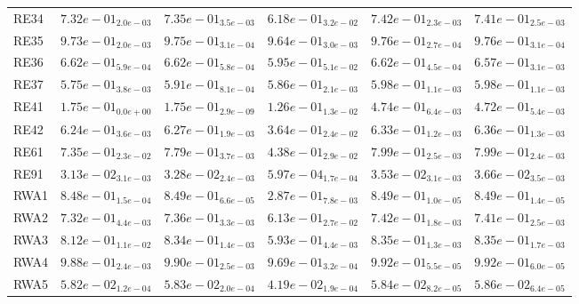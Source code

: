 \documentclass{article}
\begin{document}
\begin{table}
\begin{scriptsize}
\begin{tabular}{llllll}
RE34 & $  7.32e-01_{ 2.0e-03}$ & $  7.35e-01_{ 3.5e-03}$ & $  6.18e-01_{ 3.2e-02}$ & \cellcolor{gray95}$  7.42e-01_{ 2.3e-03}$ & \cellcolor{gray25}$  7.41e-01_{ 2.5e-03}$ \\
RE35 & $  9.73e-01_{ 2.0e-03}$ & $  9.75e-01_{ 3.1e-04}$ & $  9.64e-01_{ 3.0e-03}$ & \cellcolor{gray95}$  9.76e-01_{ 2.7e-04}$ & \cellcolor{gray25}$  9.76e-01_{ 3.1e-04}$ \\
RE36 & $  6.62e-01_{ 5.9e-04}$ & \cellcolor{gray25}$  6.62e-01_{ 5.8e-04}$ & $  5.95e-01_{ 5.1e-02}$ & \cellcolor{gray95}$  6.62e-01_{ 4.5e-04}$ & $  6.57e-01_{ 3.1e-03}$ \\
RE37 & $  5.75e-01_{ 3.8e-03}$ & $  5.91e-01_{ 8.1e-04}$ & $  5.86e-01_{ 2.1e-03}$ & \cellcolor{gray95}$  5.98e-01_{ 1.1e-03}$ & \cellcolor{gray25}$  5.98e-01_{ 1.1e-03}$ \\
RE41 & $  1.75e-01_{ 0.0e+00}$ & $  1.75e-01_{ 2.9e-09}$ & $  1.26e-01_{ 1.3e-02}$ & \cellcolor{gray95}$  4.74e-01_{ 6.4e-03}$ & \cellcolor{gray25}$  4.72e-01_{ 5.4e-03}$ \\
RE42 & $  6.24e-01_{ 3.6e-03}$ & $  6.27e-01_{ 1.9e-03}$ & $  3.64e-01_{ 2.4e-02}$ & \cellcolor{gray25}$  6.33e-01_{ 1.2e-03}$ & \cellcolor{gray95}$  6.36e-01_{ 1.3e-03}$ \\
RE61 & $  7.35e-01_{ 2.3e-02}$ & $  7.79e-01_{ 3.7e-03}$ & $  4.38e-01_{ 2.9e-02}$ & \cellcolor{gray95}$  7.99e-01_{ 2.5e-03}$ & \cellcolor{gray25}$  7.99e-01_{ 2.4e-03}$ \\
RE91 & $  3.13e-02_{ 3.1e-03}$ & $  3.28e-02_{ 2.4e-03}$ & $  5.97e-04_{ 1.7e-04}$ & \cellcolor{gray25}$  3.53e-02_{ 3.1e-03}$ & \cellcolor{gray95}$  3.66e-02_{ 3.5e-03}$ \\
RWA1 & $  8.48e-01_{ 1.5e-04}$ & $  8.49e-01_{ 6.6e-05}$ & $  2.87e-01_{ 7.8e-03}$ & \cellcolor{gray95}$  8.49e-01_{ 1.0e-05}$ & \cellcolor{gray25}$  8.49e-01_{ 1.4e-05}$ \\
RWA2 & $  7.32e-01_{ 4.4e-03}$ & $  7.36e-01_{ 3.3e-03}$ & $  6.13e-01_{ 2.7e-02}$ & \cellcolor{gray95}$  7.42e-01_{ 1.8e-03}$ & \cellcolor{gray25}$  7.41e-01_{ 2.5e-03}$ \\
RWA3 & $  8.12e-01_{ 1.1e-02}$ & $  8.34e-01_{ 1.4e-03}$ & $  5.93e-01_{ 4.4e-03}$ & \cellcolor{gray25}$  8.35e-01_{ 1.3e-03}$ & \cellcolor{gray95}$  8.35e-01_{ 1.7e-03}$ \\
RWA4 & $  9.88e-01_{ 2.4e-03}$ & $  9.90e-01_{ 2.5e-03}$ & $  9.69e-01_{ 3.2e-04}$ & \cellcolor{gray25}$  9.92e-01_{ 5.5e-05}$ & \cellcolor{gray95}$  9.92e-01_{ 6.0e-05}$ \\
RWA5 & $  5.82e-02_{ 1.2e-04}$ & $  5.83e-02_{ 2.0e-04}$ & $  4.19e-02_{ 1.9e-04}$ & \cellcolor{gray25}$  5.84e-02_{ 8.2e-05}$ & \cellcolor{gray95}$  5.86e-02_{ 6.4e-05}$ \\

\end{tabular}
\end{scriptsize}
\end{table}
\end{document}
